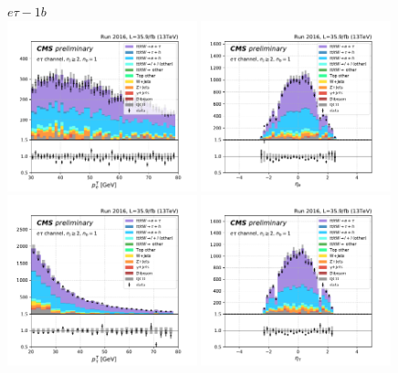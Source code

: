 \begin{figure}[ht]
    \centering
    $e\tau - 1b$ \\
    \includegraphics[width=0.49\textwidth]{chapters/Appendix/sectionPlots/figures/kinematics_pickles/etau/1b/etau_1b_lepton1_pt.pdf}
    \includegraphics[width=0.49\textwidth]{chapters/Appendix/sectionPlots/figures/kinematics_pickles/etau/1b/etau_1b_lepton1_eta.pdf}
    \includegraphics[width=0.49\textwidth]{chapters/Appendix/sectionPlots/figures/kinematics_pickles/etau/1b/etau_1b_lepton2_pt.pdf}
    \includegraphics[width=0.49\textwidth]{chapters/Appendix/sectionPlots/figures/kinematics_pickles/etau/1b/etau_1b_lepton2_eta.pdf}

\end{figure}
